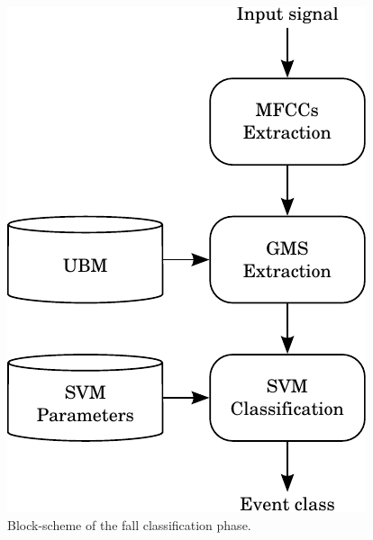 \begin{figure}[t]
	\centering
	\includegraphics[width=0.5\columnwidth]{img/scheme_classify_bn.pdf}
	\caption{Block-scheme of the fall classification phase.}
	\label{fig:scheme-classify-color}
\end{figure}

%

